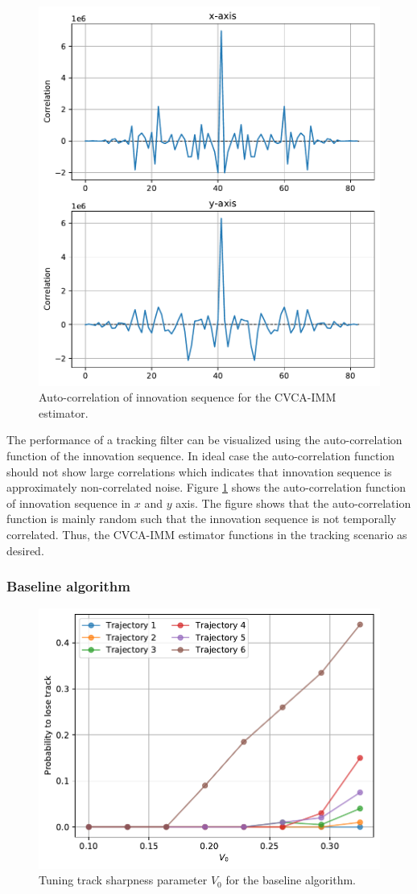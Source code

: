 \documentclass[english, 12pt, a4paper, elec, utf8, a-1b, online]{aaltothesis}
\begin{document}
\begin{figure}[bt]
    \centering
    \includegraphics[width=0.7\linewidth]{figures/benchmark/IMM/correlation_imm.pdf}
    \caption{Auto-correlation of innovation sequence for the CVCA-IMM estimator.}
    \label{fig:auto_correlation}
\end{figure}

The performance of a tracking filter can be visualized using the auto-correlation function of the innovation sequence.
In ideal case the auto-correlation function should not show large correlations which indicates that innovation sequence is approximately non-correlated noise.
Figure \ref{fig:auto_correlation} shows the auto-correlation function of innovation sequence in $x$ and $y$ axis.
The figure shows that the auto-correlation function is mainly random such that the innovation sequence is not temporally correlated.
Thus, the CVCA-IMM estimator functions in the tracking scenario as desired.



\subsubsection{Baseline algorithm}

\begin{figure}[tb]
    \centering
    \includegraphics[width=0.7\linewidth]{figures/benchmark/Simulations/plt_baseline.pdf}
    \caption{Tuning track sharpness parameter $V_0$ for the baseline algorithm.}
    \label{fig:baseline_plt}
\end{figure}
\end{document}
